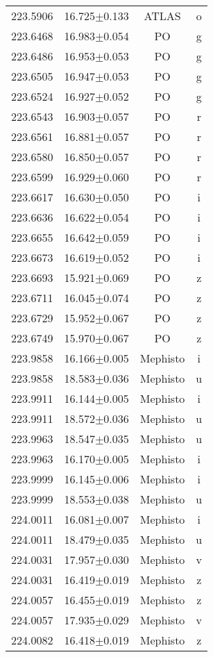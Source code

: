 \begin{table}
\begin{tabular}{cccc}
223.5906 & 16.725$\pm$0.133 & ATLAS & o \\
223.6468 & 16.983$\pm$0.054 & PO & g \\
223.6486 & 16.953$\pm$0.053 & PO & g \\
223.6505 & 16.947$\pm$0.053 & PO & g \\
223.6524 & 16.927$\pm$0.052 & PO & g \\
223.6543 & 16.903$\pm$0.057 & PO & r \\
223.6561 & 16.881$\pm$0.057 & PO & r \\
223.6580 & 16.850$\pm$0.057 & PO & r \\
223.6599 & 16.929$\pm$0.060 & PO & r \\
223.6617 & 16.630$\pm$0.050 & PO & i \\
223.6636 & 16.622$\pm$0.054 & PO & i \\
223.6655 & 16.642$\pm$0.059 & PO & i \\
223.6673 & 16.619$\pm$0.052 & PO & i \\
223.6693 & 15.921$\pm$0.069 & PO & z \\
223.6711 & 16.045$\pm$0.074 & PO & z \\
223.6729 & 15.952$\pm$0.067 & PO & z \\
223.6749 & 15.970$\pm$0.067 & PO & z \\
223.9858 & 16.166$\pm$0.005 & Mephisto & i \\
223.9858 & 18.583$\pm$0.036 & Mephisto & u \\
223.9911 & 16.144$\pm$0.005 & Mephisto & i \\
223.9911 & 18.572$\pm$0.036 & Mephisto & u \\
223.9963 & 18.547$\pm$0.035 & Mephisto & u \\
223.9963 & 16.170$\pm$0.005 & Mephisto & i \\
223.9999 & 16.145$\pm$0.006 & Mephisto & i \\
223.9999 & 18.553$\pm$0.038 & Mephisto & u \\
224.0011 & 16.081$\pm$0.007 & Mephisto & i \\
224.0011 & 18.479$\pm$0.035 & Mephisto & u \\
224.0031 & 17.957$\pm$0.030 & Mephisto & v \\
224.0031 & 16.419$\pm$0.019 & Mephisto & z \\
224.0057 & 16.455$\pm$0.019 & Mephisto & z \\
224.0057 & 17.935$\pm$0.029 & Mephisto & v \\
224.0082 & 16.418$\pm$0.019 & Mephisto & z \\

\end{tabular}
\end{table}
